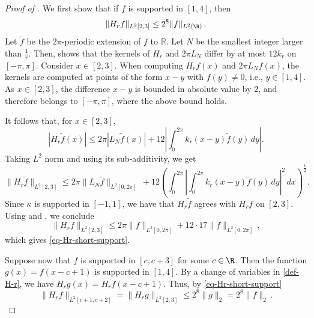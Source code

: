 \begin{proof}[Proof of ]
    \leanok
    We first show that if $f$ is supported in $[1, 4]$, then
    \begin{equation}
        \label{eq-Hr-short-support}
        \|H_r f\|_{L^2[2, 3]} \le 2^{8} \|f\|_{L^2(\R)}\,.
    \end{equation}
    Let $\tilde{f}$ be the $2\pi$-periodic extension of $f$ to $\mathbb{R}$. Let $N$ be the smallest
    integer larger than $\frac 1r$. Then,  shows that the kernels of $H_r$ and $2\pi L_N$ differ by at
    most $12k_r$ on $[-\pi, \pi]$. Consider $x \in [2,3]$. When computing $H_r f(x)$ and $2\pi L_N f(x)$, the kernels are
    computed at points of the form $x-y$ with $f(y) \ne 0$, i.e., $y \in [1,4]$. As $x\in [2,3]$, the difference
    $x-y$ is bounded in absolute value by $2$, and therefore belongs to $[-\pi, \pi]$, where the above bound holds.

    It follows that, for $x \in [2,3]$,
    \begin{equation*}
        |H_r \tilde{f}(x)|\leq 2\pi |L_N \tilde{f}(x)|+12\left|\int_{0}^{2\pi}k_r(x-y)\tilde{f}(y)\, dy\right|.
    \end{equation*}
    Taking $L^2$ norm and using its sub-additivity, we get
    \begin{equation*}
       \|H_r \tilde{f}\|_{L^2[2, 3]}\leq 2\pi \|L_N \tilde{f}\|_{L^2[0, 2\pi]}\, + 12\left(\int_{0}^{2\pi} \left|\int_{0}^{2\pi}k_r(x-y)\tilde{f}(y)\, dy\right|^2\, dx\right)^{\frac{1}{2}}.
    \end{equation*}
    Since $\kappa$ is supported in $[-1,1]$, we have that $H_r\tilde{f}$ agrees with $H_r f$ on $[2,3]$.
    Using  and , we conclude
    \begin{equation}
        \|H_r f\|_{L^2[2, 3]} \le 2\pi \|f\|_{L^2[0, 2\pi]} + 12 \cdot 17 \|f\|_{L^2[0, 2\pi]}\,,
    \end{equation}
    which gives \eqref{eq-Hr-short-support}.

    Suppose now that $f$ is supported in $[c, c+3]$ for some $c \in \R$. Then the function $g(x) = f(x-c+1)$ is supported in $[1, 4]$.
    By a change of variables in \eqref{def-H-r}, we have $H_r g(x ) = H_r f(x - c + 1)$. Thus, by \eqref{eq-Hr-short-support}
    \begin{equation}
        \label{eq-Hr-short-support-2}
        \|H_rf\|_{L^2[c+1, c+2]} = \|H_r g\|_{L^2[2,3]} \le 2^{8} \|g\|_2 = 2^8 \|f\|_2\,.
    \end{equation}


\end{proof}
